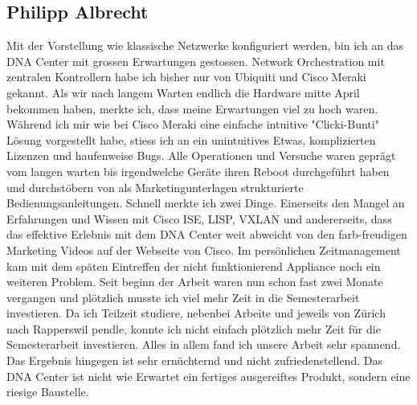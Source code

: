 \subsection{Philipp Albrecht}
Mit der Vorstellung wie klassische Netzwerke konfiguriert werden, bin ich an das DNA Center mit grossen Erwartungen gestossen. Network Orchestration mit zentralen Kontrollern habe ich bisher nur von Ubiquiti und Cisco Meraki gekannt. Als wir nach langem Warten endlich die Hardware mitte April bekommen haben, merkte ich, dass meine Erwartungen viel zu hoch waren. Während ich mir wie bei Cisco Meraki eine einfache intuitive "Clicki-Bunti" Lösung vorgestellt habe, stiess ich an ein unintuitives Etwas, komplizierten Lizenzen und haufenweise Bugs. Alle Operationen und Versuche waren geprägt vom langen warten bis irgendwelche Geräte ihren Reboot durchgeführt haben und durchstöbern von als Marketingunterlagen strukturierte Bedienungsanleitungen. Schnell merkte ich zwei Dinge. Einerseits den Mangel an Erfahrungen und Wissen mit Cisco ISE, LISP, VXLAN und andererseits, dass das effektive Erlebnis mit dem DNA Center weit abweicht von den farb-freudigen Marketing Videos auf der Webseite von Cisco. 
Im persönlichen Zeitmanagement kam mit dem späten Eintreffen der nicht funktionierend Appliance noch ein weiteren Problem. Seit beginn der Arbeit waren nun schon fast zwei Monate vergangen und plötzlich musste ich viel mehr Zeit in die Semesterarbeit investieren. Da ich Teilzeit studiere, nebenbei Arbeite und jeweils von Zürich nach Rapperswil pendle, konnte ich nicht einfach plötzlich mehr Zeit für die Semesterarbeit investieren. 
Alles in allem fand ich unsere Arbeit sehr spannend. Das Ergebnis hingegen ist sehr ernüchternd und nicht zufriedenstellend. Das DNA Center ist nicht wie Erwartet ein fertiges ausgereiftes Produkt, sondern eine riesige Baustelle.

